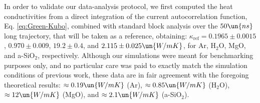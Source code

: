 In order to validate our data-analysis protocol, we first computed the heat conductivities from a direct integration of the current autocorrelation function, Eq. \eqref{eq:Green-Kubo}, combined with standard block analysis over the $50\un{ns}$ long trajectory, that will be taken as a reference, obtaining: $\kappa_{\mathrm{ref}} = 0.1965 \pm 0.0015$, $0.970 \pm 0.009$, $19.2 \pm 0.4$, and $2.115 \pm 0.025 \un{W/mK}$, for Ar, H$_2$O, MgO, and a-SiO$_2$, respectively. 
Although our simulations were meant for benchmarking purposes only, and no particular care was paid to exactly match the simulation conditions of previous work, these data are in fair agreement with the foregoing theoretical results: $\approx 0.19\un{W/mK}$ (Ar),\cite{Argon-FF} $\approx 0.85\un{W/mK}$ (H$_2$O),\cite{Romer2012} $\approx 12\un{W/mK}$ (MgO),\cite{MgO-FF} and $\approx 2.1\un{W/mK}$ (a-SiO$_2$).\cite{Larkin2014}

